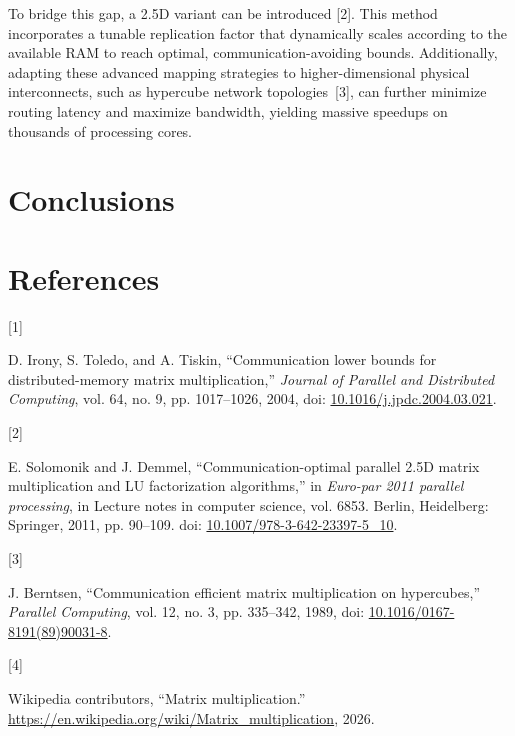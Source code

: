 \documentclass[
  12pt,
]{article}
\newlength{\cslhangindent}
\newlength{\csllabelwidth}
\newenvironment{CSLReferences}[2] %
 {\begin{list}{}{%
  \setlength{\itemindent}{0pt}
  \setlength{\leftmargin}{0pt}
  \setlength{\parsep}{0pt}
  \ifodd #1
   \setlength{\leftmargin}{\cslhangindent}
   \setlength{\itemindent}{-1\cslhangindent}
  \fi
  \setlength{\itemsep}{#2\baselineskip}}}
 {\end{list}}
\newcommand{\CSLLeftMargin}[1]{\parbox[t]{\csllabelwidth}{\strut#1\strut}}
\newcommand{\CSLRightInline}[1]{\parbox[t]{\linewidth - \csllabelwidth}{\strut#1\strut}}
\begin{document}
To bridge this gap, a 2.5D variant can be introduced {[}2{]}. This
method incorporates a tunable replication factor that dynamically scales
according to the available RAM to reach optimal, communication-avoiding
bounds. Additionally, adapting these advanced mapping strategies to
higher-dimensional physical interconnects, such as hypercube network
topologies~{[}3{]}, can further minimize routing latency and maximize
bandwidth, yielding massive speedups on thousands of processing cores.

\section{Conclusions}\label{conclusions}

\section*{References}\label{references}

\protect{}\label{refs}
\begin{CSLReferences}{0}{0}
\CSLLeftMargin{{[}1{]} }%
\CSLRightInline{D. Irony, S. Toledo, and A. Tiskin, {``Communication
lower bounds for distributed-memory matrix multiplication,''}
\emph{Journal of Parallel and Distributed Computing}, vol. 64, no. 9,
pp. 1017--1026, 2004, doi:
\href{https://doi.org/10.1016/j.jpdc.2004.03.021}{10.1016/j.jpdc.2004.03.021}.}

\CSLLeftMargin{{[}2{]} }%
\CSLRightInline{E. Solomonik and J. Demmel, {``Communication-optimal
parallel 2.5D matrix multiplication and LU factorization algorithms,''}
in \emph{Euro-par 2011 parallel processing}, in Lecture notes in
computer science, vol. 6853. Berlin, Heidelberg: Springer, 2011, pp.
90--109. doi:
\href{https://doi.org/10.1007/978-3-642-23397-5_10}{10.1007/978-3-642-23397-5\_10}.}

\CSLLeftMargin{{[}3{]} }%
\CSLRightInline{J. Berntsen, {``Communication efficient matrix
multiplication on hypercubes,''} \emph{Parallel Computing}, vol. 12, no.
3, pp. 335--342, 1989, doi:
\href{https://doi.org/10.1016/0167-8191(89)90031-8}{10.1016/0167-8191(89)90031-8}.}

\CSLLeftMargin{{[}4{]} }%
\CSLRightInline{Wikipedia contributors, {``Matrix multiplication.''}
\url{https://en.wikipedia.org/wiki/Matrix_multiplication}, 2026.}

\end{CSLReferences}
\end{document}
